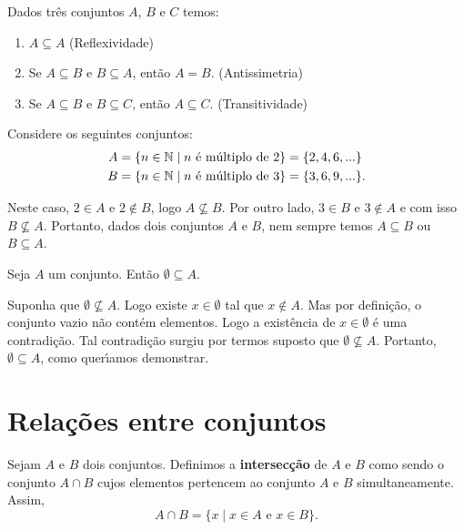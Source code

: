 \begin{proposicao}
	Dados três conjuntos $A$, $B$ e $C$ temos:
	\begin{enumerate}
		\item $A\subseteq A$ (Reflexividade)
		\item Se $A\subseteq B \mbox{ e } B\subseteq A$, ent{\~a}o $A=B$. (Antissimetria)
		\item Se $A\subseteq B$ e $B\subseteq C$, ent{\~a}o $A\subseteq C$. (Transitividade)
	\end{enumerate}
\end{proposicao}


Considere os seguintes conjuntos:
\begin{align*}
	A &= \{ n \in \mathbb{N} \mid n \mbox{ {\'e} m{\'u}ltiplo de } 2\} = \{2,4,6,...\}\\
	B &= \{n \in \mathbb{N} \mid n \mbox{ {\'e} m{\'u}ltiplo de } 3\} = \{3,6,9,...\}.
\end{align*}


Neste caso, $2 \in A$ e $2 \notin B$, logo $A \nsubseteq B$. Por outro lado, $3 \in B$ e $3 \notin A$ e com isso $B \nsubseteq A$. Portanto, dados dois conjuntos $A$ e $B$, nem sempre temos $A \subseteq B$ ou $B \subseteq A$.

\begin{proposicao} 
	Seja $A$ um conjunto. Ent{\~a}o $ \emptyset \subseteq A$.
\end{proposicao}
\begin{prova}
	Suponha que $\emptyset \nsubseteq A$. Logo existe $x \in \emptyset$ tal que $x \notin A$. Mas por defini{\c c}{\~a}o, o conjunto vazio n{\~a}o cont{\'e}m elementos. Logo a exist\^encia de $x \in \emptyset$ {\'e} uma contradi{\c c}{\~a}o. Tal contradi\c{c}\~ao surgiu por termos suposto que $\emptyset \nsubseteq A$. Portanto, $\emptyset \subseteq A$, como quer{\'\i}amos demonstrar.
\end{prova}

\section{Rela{\c c}{\~o}es entre conjuntos}

\begin{definicao}[Intersec{\c c}{\~a}o]\label{intersecao_conjunto}
Sejam $A$ e $B$ dois conjuntos. Definimos a \textbf{intersec{\c c}{\~a}o} de $A$ e $B$ como sendo o conjunto $A \cap B$ cujos elementos pertencem ao conjunto $A$ e $B$ simultaneamente. Assim,
\[
A \cap B = \{x \mid x \in A\mbox{ e }  x \in B\}.
\]
\end{definicao}

